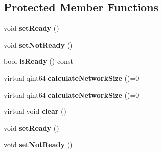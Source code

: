 \subsection*{Protected Member Functions}
\begin{DoxyCompactItemize}
\item 
\hypertarget{class_k_cloud_1_1_net_object_a549cd5cbde57b491e4748c17e5a04a02}{void {\bfseries set\-Ready} ()}\label{class_k_cloud_1_1_net_object_a549cd5cbde57b491e4748c17e5a04a02}

\item 
\hypertarget{class_k_cloud_1_1_net_object_a01ec2678e0dc68845d76115269fb58b1}{void {\bfseries set\-Not\-Ready} ()}\label{class_k_cloud_1_1_net_object_a01ec2678e0dc68845d76115269fb58b1}

\item 
\hypertarget{class_k_cloud_1_1_net_object_a93e9cf7c27cce29a0c97fc23195f4352}{bool {\bfseries is\-Ready} () const }\label{class_k_cloud_1_1_net_object_a93e9cf7c27cce29a0c97fc23195f4352}

\item 
\hypertarget{class_k_cloud_1_1_net_object_a38f65014ee542d84967d7cf829bf2d4c}{virtual qint64 {\bfseries calculate\-Network\-Size} ()=0}\label{class_k_cloud_1_1_net_object_a38f65014ee542d84967d7cf829bf2d4c}

\item 
\hypertarget{class_k_cloud_1_1_net_object_a38f65014ee542d84967d7cf829bf2d4c}{virtual qint64 {\bfseries calculate\-Network\-Size} ()=0}\label{class_k_cloud_1_1_net_object_a38f65014ee542d84967d7cf829bf2d4c}

\item 
\hypertarget{class_k_cloud_1_1_net_object_a19494b9dd2318325504a5d8ccc242c48}{virtual void {\bfseries clear} ()}\label{class_k_cloud_1_1_net_object_a19494b9dd2318325504a5d8ccc242c48}

\item 
\hypertarget{class_k_cloud_1_1_net_object_a549cd5cbde57b491e4748c17e5a04a02}{void {\bfseries set\-Ready} ()}\label{class_k_cloud_1_1_net_object_a549cd5cbde57b491e4748c17e5a04a02}

\item 
\hypertarget{class_k_cloud_1_1_net_object_a01ec2678e0dc68845d76115269fb58b1}{void {\bfseries set\-Not\-Ready} ()}\label{class_k_cloud_1_1_net_object_a01ec2678e0dc68845d76115269fb58b1}

\end{DoxyCompactItemize}
